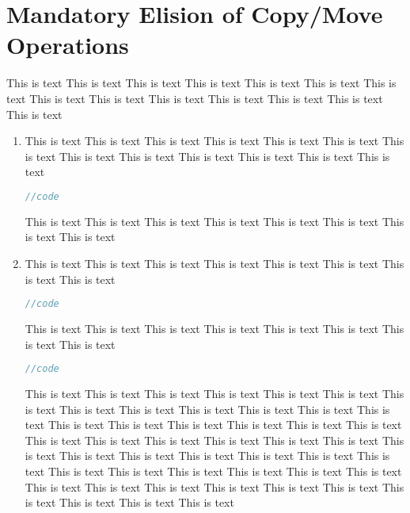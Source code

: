\documentclass[a4paper]{uestcreport}
\begin{document}
\section{Mandatory Elision of Copy/Move Operations}
This is text This is text This is text This is text This is text This is text This is text This is text 
This is text This is text This is text This is text This is text This is text 
\begin{enumerate}
    \item This is text This is text This is text This is text This is text This is text This is text This is text 
This is text This is text This is text This is text This is text 
          \begin{lstlisting}[language=C++]
//code
        \end{lstlisting}

          This is text This is text This is text This is text This is text This is text This is text This is text 
    \item This is text This is text This is text This is text This is text This is text This is text This is text 
          \begin{lstlisting}[language=C++]
//code
    \end{lstlisting}

          This is text This is text This is text This is text This is text This is text This is text This is text 
          \begin{lstlisting}[language=C++]
//code
    \end{lstlisting}

          This is text This is text This is text This is text This is text This is text This is text This is text This is text This is text This is text This is text This is text This is text This is text This is text This is text This is text This is text This is text This is text This is text This is text This is text This is text This is text This is text This is text This is text This is text This is text This is text This is text This is text This is text This is text This is text This is text This is text This is text This is text This is text This is text This is text This is text This is text This is text This is text 
\end{enumerate}
\end{document}
